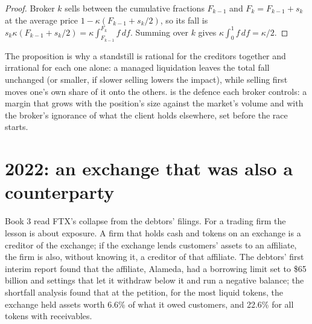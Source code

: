 \begin{proof}
Broker $k$ sells between the cumulative fractions $F_{k-1}$ and $F_k=F_{k-1}+s_k$ at the average price $1-\kappa(F_{k-1}+s_k/2)$, so its fall is
$s_k\kappa(F_{k-1}+s_k/2)=\kappa\int_{F_{k-1}}^{F_k}f\,df$. Summing over $k$ gives $\kappa\int_0^1f\,df=\kappa/2$.
\end{proof}

The proposition is why a standstill is rational for the creditors together and irrational for each one alone: a managed liquidation leaves the total
fall unchanged (or smaller, if slower selling lowers the impact), while selling first moves one's own share of it onto the others. 
is the defence each broker controls: a margin that grows with the position's size against the market's volume and with the broker's ignorance of
what the client holds elsewhere, set before the race starts.

\section{2022: an exchange that was also a counterparty}

Book 3 read FTX's collapse from the debtors' filings. For a trading firm the lesson is about exposure. A firm that holds cash and tokens on an exchange
is a creditor of the exchange; if the exchange lends customers' assets to an affiliate, the firm is also, without knowing it, a creditor of that
affiliate. The debtors' first interim report found that the affiliate, Alameda, had a borrowing limit set to \$65 billion and settings that let it
withdraw below it and run a negative balance; the shortfall analysis found that at the petition, for the most liquid tokens, the exchange held assets
worth 6.6\% of what it owed customers, and 22.6\% for all tokens with receivables.

